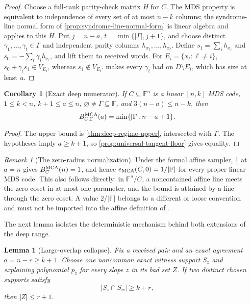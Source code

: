 \documentclass[11pt,a4paper]{amsart}
\numberwithin{equation}{section}
\newtheorem{lemma}[lemma]{Lemma}
\newtheorem{corollary}[corollary]{Corollary}
\theoremstyle{remark}
\newtheorem{remark}[remark]{Remark}
\newcommand{\F}{\mathbb F}
\newcommand{\abs}[1]{\lvert #1\rvert}
\begin{document}
\begin{proof}
Choose a full-rank parity-check matrix \(H\) for \(C\).  The MDS property
is equivalent to independence of every set of at most \(n-k\) columns; the
syndrome-line normal form of \cref{prop:syndrome-line-normal-form} is linear
algebra and applies to this \(H\).  Put \(j=n-a\),
\(t=\min\{\abs\Gamma,j+1\}\), and choose distinct
\(\gamma_1,\ldots,\gamma_t\in\Gamma\) and independent parity columns
\(h_{x_1},\ldots,h_{x_t}\).  Define
\(s_1=\sum_i h_{x_i}\) and \(s_0=-\sum_i\gamma_i h_{x_i}\), and lift them
to received words.  For \(E_i=\{x_\ell:\ell\ne i\}\),
\(s_0+\gamma_i s_1\in V_{E_i}\), whereas \(s_1\notin V_{E_i}\).
 makes every \(\gamma_i\) bad on
\(D\setminus E_i\), which has size at least \(a\).
\end{proof}

\begin{corollary}[Exact deep numerator]\label{cor:exact-deep-numerator}
If \(C\subseteq\F^n\) is a linear \([n,k]\) MDS code,
\(1\le k<n\), \(k+1\le a\le n\),
\(\varnothing\ne\Gamma\subseteq\F\), and \(3(n-a)\le n-k\), then
\[
 B_{C,\Gamma}^{\rm MCA}(a)
 =\min\{\abs\Gamma,n-a+1\}.
\]
\end{corollary}

\begin{proof}
The upper bound is \cref{thm:deep-regime-upper}, intersected with
\(\Gamma\).  The hypotheses imply \(a\ge k+1\), so
\cref{prop:universal-tangent-floor} gives equality.
\end{proof}

\begin{remark}[The zero-radius normalization]
Under the formal affine sampler, \cref{cor:exact-deep-numerator} at
\(a=n\) gives \(B_C^{\rm MCA}(n)=1\), and hence
\(e_{\rm MCA}(C,0)=1/\abs\F\) for every proper linear MDS code.  This also
follows directly: in \(\F^n/C\), a noncontained affine line meets
the zero coset in at most one parameter, and the bound is attained by a
line through the zero coset.  A value \(2/\abs\F\) belongs to a different
or loose convention and must not be imported into the affine definition
of \cite{ABF26}.
\end{remark}

The next lemma isolates the deterministic mechanism behind both extensions
of the deep range.

\begin{lemma}[Large-overlap collapse]
\label{lem:large-overlap-collapse}
Fix a received pair and an exact agreement \(a=n-r\ge k+1\).  Choose one
noncommon exact witness support \(S_z\) and explaining polynomial \(p_z\)
for every slope \(z\) in its bad set \(Z\).  If two distinct chosen
supports satisfy
\[
                    \abs{S_z\cap S_w}\ge k+r,       \tag{MO1}
\label{eq:large-overlap-collapse}
\]
then \(\abs Z\le r+1\).
\end{lemma}
\end{document}
